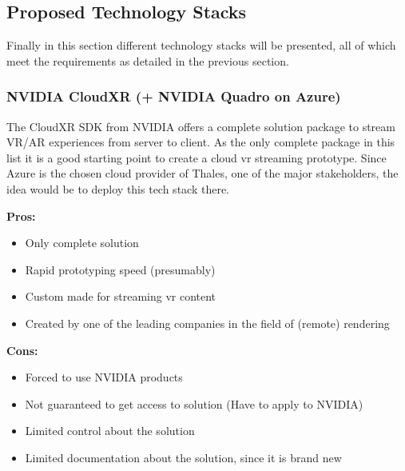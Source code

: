 \newpage
\subsection{Proposed Technology Stacks}
Finally in this section different technology stacks will be presented, all of which meet the requirements as detailed in the previous section.
\subsubsection{NVIDIA CloudXR (+ NVIDIA Quadro on Azure)}
The CloudXR SDK from NVIDIA offers a complete solution package to stream VR/AR experiences from server to client. As the only complete package in this list it is a good starting point to create a cloud \acrshort{vr} streaming prototype. Since Azure is the chosen cloud provider of Thales, one of the major stakeholders, the idea would be to deploy this tech stack there. \\
\newline
\begin{varwidth}[t]{.5\textwidth}
\renewcommand\labelitemi{+}
\textbf{Pros:}
\begin{itemize}
\item Only complete solution
\item Rapid prototyping speed (presumably)
\item Custom made for streaming \acrshort{vr} content
\item Created by one of the leading companies in the field of (remote) rendering
\end{itemize}
\end{varwidth}
\hspace{4em}
\begin{varwidth}[t]{.5\textwidth}
\renewcommand\labelitemi{-}
\textbf{Cons:}
\begin{itemize}
\item Forced to use NVIDIA products
\item Not guaranteed to get access to solution (Have to apply to NVIDIA)
\item Limited control about the solution
\item Limited documentation about the solution, since it is brand new
\end{itemize}
\end{varwidth}

